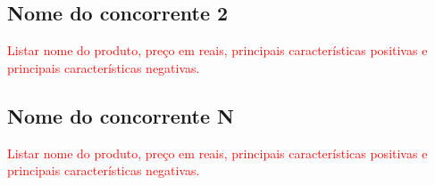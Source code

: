 \subsection{Nome do concorrente 2}

\textcolor{red}{Listar nome do produto, preço em reais, principais características
positivas e principais características negativas.}

\subsection{Nome do concorrente N}

\textcolor{red}{Listar nome do produto, preço em reais, principais características
positivas e principais características negativas.}
